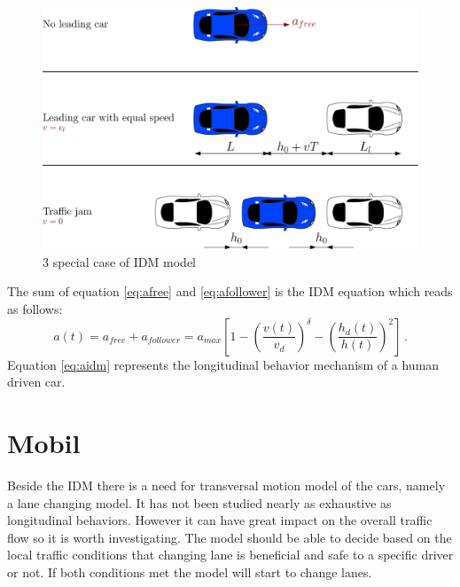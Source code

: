 \documentclass[a4paper,11pt,twoside]{report}
\begin{document}
			\begin{figure}[h]
				\centering
				\includegraphics[width=\textwidth]{idm.eps}
				\caption{3 special case of IDM model}
				\label{fig:idm}
			\end{figure}
			The sum of equation \ref{eq:afree} and \ref{eq:afollower} is the IDM equation which reads as follows:
			\begin{equation}
				a(t)=a_{free}+a_{follower}=a_{max}\left [ 1 - \left ( \frac{v(t)}{v_d} \right )^\delta - \left ( \frac{h_d(t)}{h(t)} \right )^2 \right ]\,.
			\label{eq:aidm}
			\end{equation}
			Equation \ref{eq:aidm} represents the longitudinal behavior mechanism of a human driven car.
		\section{Mobil}
			Beside the IDM there is a need for transversal motion model of the cars, namely a lane changing model. It has not been studied nearly as exhaustive as longitudinal behaviors. However it can have great impact on the overall traffic flow so it is worth investigating. The model should be able to decide based on the local traffic conditions that changing lane is beneficial and safe to a specific driver or not. If both conditions met the model will start to change lanes.
\end{document}
